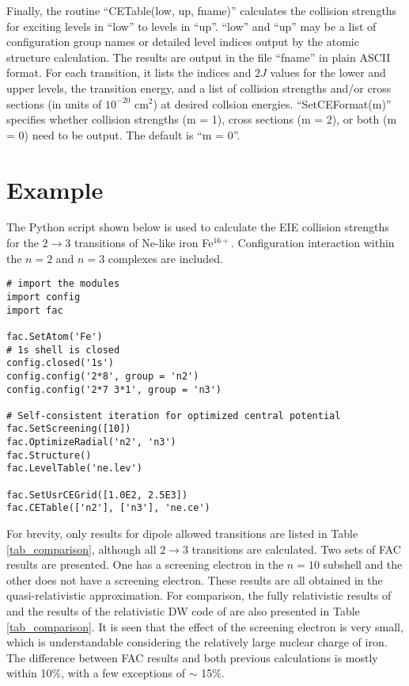 \documentclass{elsart}
\begin{document}
Finally, the routine ``CETable(low, up, fname)'' calculates the collision
strengths for exciting levels in ``low'' to levels in ``up''. ``low'' and
``up'' may be a list of configuration group names or detailed level indices
output by the atomic structure calculation. The results are output in the file
``fname'' in plain ASCII format. For each transition, it lists the indices and
$2J$ values for the lower and upper levels, the transition energy, and a list
of collision strengths and/or cross sections (in units of $10^{-20}$ cm$^2$) at
desired collsion energies. ``SetCEFormat(m)'' specifies whether collision
strengths (m = 1), cross sections (m = 2), or both (m = 0) need to be
output. The default is ``m = 0''. 

\section{Example}
\label{sec_example}
The Python script shown below is used to calculate the EIE collision strengths
for the $2\to 3$ transitions of Ne-like iron Fe$^{16+}$. Configuration
interaction within the $n = 2$ and $n = 3$ complexes are included. 
\begin{verbatim}
# import the modules
import config
import fac

fac.SetAtom('Fe')
# 1s shell is closed
config.closed('1s')
config.config('2*8', group = 'n2')
config.config('2*7 3*1', group = 'n3')

# Self-consistent iteration for optimized central potential
fac.SetScreening([10])
fac.OptimizeRadial('n2', 'n3')
fac.Structure()
fac.LevelTable('ne.lev')

fac.SetUsrCEGrid([1.0E2, 2.5E3])
fac.CETable(['n2'], ['n3'], 'ne.ce')
\end{verbatim}

For brevity, only results for dipole allowed transitions are listed in Table
\ref{tab_comparison}, although all $2 \to 3$ transitions are calculated. Two
sets of FAC results are presented. One has a screening electron in the $n =
10$ subshell and the other does not have a screening electron. These results
are all obtained in the quasi-relativistic approximation. For comparison, the 
fully relativistic results of \citet{zhang89} and the results of the
relativistic DW code of \citet{hagelstein87} are also presented in Table \ref{tab_comparison}. It 
is seen that the effect of the screening electron is very small, which is
understandable considering the relatively large nuclear charge of iron. 
The difference between FAC results and both previous calculations is mostly
within 10\%, with a few exceptions of $\sim$ 15\%. 
\end{document}

